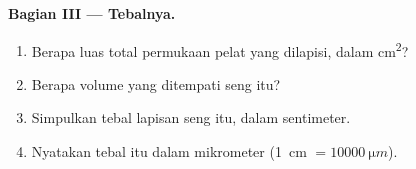 \begin{problem}
\medskip
\noindent\textbf{Bagian III --- Tebalnya.}
\begin{enumerate}[resume]
  \item Berapa luas total permukaan pelat yang dilapisi, dalam
        \unit{cm^2}?
  \item Berapa volume yang ditempati seng itu?
  \item Simpulkan tebal lapisan seng itu, dalam sentimeter.
  \item Nyatakan tebal itu dalam mikrometer
        (\qty{1}{cm} $= \qty{10000}{\micro m}$).
\end{enumerate}
\end{problem}
